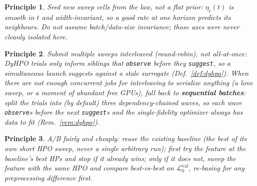 \documentclass[11pt]{article}
\newcommand{\vlnr}{\mathcal{L}^{\mathrm{val}}_{0}}   %
\newcommand{\code}[1]{\texttt{#1}}
\newtheorem{principle}{Principle}
\begin{document}
\begin{principle} Seed new sweep cells from the law, not a flat prior: $\eta_c(t)$ is smooth in
$t$ and width-invariant, so a good rate at one horizon predicts its neighbours. Do \emph{not}
assume batch/data-size invariance; those axes were never cleanly isolated here.
\end{principle}
\begin{principle} Submit multiple sweeps \emph{interleaved} (round-robin), not all-at-once: DyHPO
trials only inform siblings that \code{observe} before they \code{suggest}, so a simultaneous
launch suggests against a stale surrogate (Def.~\ref{def:dyhpo}). When there are not enough
concurrent jobs for interleaving to serialize anything (a lone sweep, or a moment of abundant
free GPUs), fall back to \textbf{sequential batches}: split the trials into (by default) three
dependency-chained waves, so each wave \code{observe}s before the next \code{suggest}s and the
single-fidelity optimizer always has data to fit (Rem.~\ref{rem:dyhpo}).
\end{principle}
\begin{principle} A/B fairly and cheaply: reuse the existing baseline (the best of its own short
HPO sweep, never a single arbitrary run); first try the feature at the baseline's best HPs and
stop if it already wins; only if it does not, sweep the feature with the same HPO and compare
best-vs-best on $\vlnr$, re-basing for any preprocessing difference first.
\end{principle}
\end{document}
